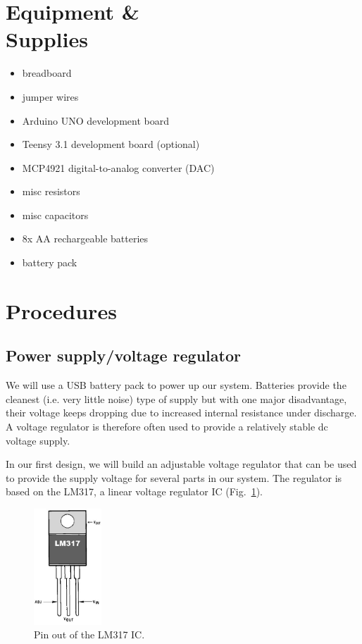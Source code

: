 \documentclass[letterpaper, 11pt]{article}
\begin{document}
\newpage
\section{Equipment \& \\Supplies}

\begin{itemize}[itemsep=0.5ex]
\item breadboard
\item jumper wires
\item Arduino UNO development board
\item Teensy 3.1 development board (optional)
\item MCP4921 digital-to-analog converter (DAC)
\item misc resistors
\item misc capacitors
\item 8x AA rechargeable batteries
\item battery pack
\end{itemize}



\newpage
\section{Procedures}

\subsection{Power supply/voltage regulator}
\label{sec:lm317}

We will use a USB battery pack to power up our system. Batteries provide the cleanest (i.e. very little noise) type of supply but with one major disadvantage, their voltage keeps dropping due to increased internal resistance under discharge. A voltage regulator is therefore often used to provide a relatively stable dc voltage supply.

In our first design, we will build an adjustable voltage regulator that can be used to provide the supply voltage for several parts in our system. The regulator is based on the LM317, a linear voltage regulator IC (Fig.~\ref{fig:lm317}).

\begin{figure}[h]
	\centering
	\includegraphics[width=1in]{lm317}
	\caption{Pin out of the LM317 IC.}
	\label{fig:lm317}
\end{figure}
\end{document}
